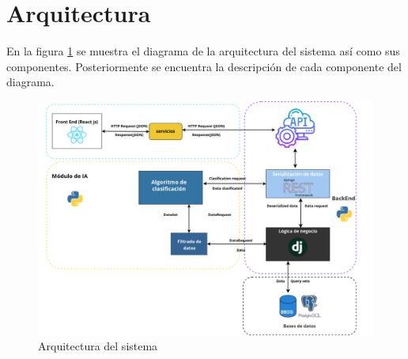 \clearpage
\section{Arquitectura}
En la figura \ref{arq:arquitectura} se muestra el diagrama de la arquitectura del sistema así como sus componentes.
Posteriormente se encuentra la descripción de cada componente del diagrama.

\begin{figure}[hbtp!]
    \begin{center}
        \includegraphics[width=.9\textwidth]{propuesta/imagenes/arqui.png}
    \end{center}
    \caption{Arquitectura del sistema}
    \label{arq:arquitectura}
\end{figure}




